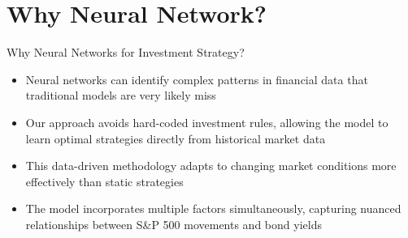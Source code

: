 \documentclass[aspectratio=169,xcolor=dvipsnames]{beamer}
\begin{document}
\section{Why Neural Network?}
\begin{frame}{Why Neural Networks for Investment Strategy?}
	\begin{itemize}
		\item Neural networks can identify complex patterns in financial data that traditional models are very likely miss
		\item Our approach avoids hard-coded investment rules, allowing the model to learn optimal strategies directly from historical market data
		\item This data-driven methodology adapts to changing market conditions more effectively than static strategies
		\item The model incorporates multiple factors simultaneously, capturing nuanced relationships between S\&P 500 movements and bond yields
	\end{itemize}
\end{frame}
\end{document}
